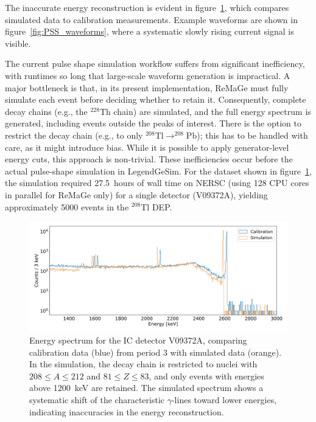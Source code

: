 The inaccurate energy reconstruction is evident in figure~\ref{fig:PSS_histogram}, which compares simulated data to calibration measurements. Example waveforms are shown in figure~\ref{fig:PSS_waveforms}, where a systematic slowly rising current signal is visible.  

The current pulse shape simulation workflow suffers from significant inefficiency, with runtimes so long that large-scale waveform generation is impractical. 
A major bottleneck is that, in its present implementation, ReMaGe must fully simulate each event before deciding whether to retain it. Consequently, complete decay chains (e.g., the $^{228}$Th chain) are simulated, and the full energy spectrum is generated, including events outside the peaks of interest. 
There is the option to restrict the decay chain (e.g., to only $^{208} \mathrm{Tl} \rightarrow ^{208} \mathrm{Pb}$); this has to be handled with care, as it might introduce bias. While it is possible to apply generator-level energy cuts, this approach is non-trivial. These inefficiencies occur before the actual pulse-shape simulation in LegendGeSim. 
For the dataset shown in figure~\ref{fig:PSS_histogram}, the simulation required 27.5~hours of wall time on NERSC (using 128 CPU cores in parallel for ReMaGe only) for a single detector (V09372A), yielding approximately 5000 events in the $^{208}$Tl DEP.  

\begin{figure}
\centering
\includegraphics[width=\linewidth]{figures/05_PSD/Plot_cal_vs_PSS.png}
\caption{Energy spectrum for the IC detector V09372A, comparing calibration data (blue) from period 3 with simulated data (orange). In the simulation, the decay chain is restricted to nuclei with $208 \leq A \leq 212$ and $81 \leq Z \leq 83$, and only events with energies above 1200~keV are retained. The simulated spectrum shows a systematic shift of the characteristic $\gamma$-lines toward lower energies, indicating inaccuracies in the energy reconstruction.}
\label{fig:PSS_histogram}
\end{figure}

